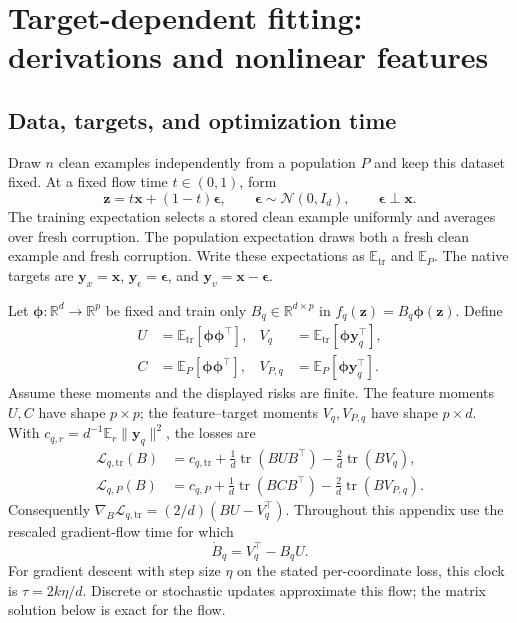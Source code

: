 \section{Target-dependent fitting: derivations and nonlinear features}
\label{app:target_fitting}

\subsection{Data, targets, and optimization time}
Draw $n$ clean examples independently from a population $P$ and keep this
dataset fixed. At a fixed flow time $t\in(0,1)$, form
\[
 \mathbf z=t\mathbf x+(1-t)\boldsymbol\epsilon,
 \qquad \boldsymbol\epsilon\sim\mathcal N(0,I_d),
 \qquad \boldsymbol\epsilon\perp\mathbf x.
\]
The training expectation selects a stored clean example uniformly and
averages over fresh corruption. The population expectation draws both a
fresh clean example and fresh corruption. Write these expectations as
$\mathbb E_{\mathrm{tr}}$ and $\mathbb E_P$.
The native targets are
$\mathbf y_x=\mathbf x$, $\mathbf y_\epsilon=\boldsymbol\epsilon$, and
$\mathbf y_v=\mathbf x-\boldsymbol\epsilon$.

Let $\boldsymbol\phi:\mathbb R^d\to\mathbb R^p$ be fixed and train only
$B_q\in\mathbb R^{d\times p}$ in
$f_q(\mathbf z)=B_q\boldsymbol\phi(\mathbf z)$. Define
\begin{align}
 U&=\mathbb E_{\mathrm{tr}}[\boldsymbol\phi\boldsymbol\phi^\top],&
 V_q&=\mathbb E_{\mathrm{tr}}[\boldsymbol\phi\mathbf y_q^\top],\\
 C&=\mathbb E_P[\boldsymbol\phi\boldsymbol\phi^\top],&
 V_{P,q}&=\mathbb E_P[\boldsymbol\phi\mathbf y_q^\top].
\end{align}
Assume these moments and the displayed risks are finite.
The feature moments $U,C$ have shape $p\times p$; the feature--target
moments $V_q,V_{P,q}$ have shape $p\times d$.
With $c_{q,r}=d^{-1}\mathbb E_r\|\mathbf y_q\|^2$, the losses are
\begin{align}
 \mathcal L_{q,\mathrm{tr}}(B)
 &=c_{q,\mathrm{tr}}+\frac1d\operatorname{tr}(BUB^\top)
   -\frac2d\operatorname{tr}(BV_q),\\
 \mathcal L_{q,P}(B)
 &=c_{q,P}+\frac1d\operatorname{tr}(BCB^\top)
   -\frac2d\operatorname{tr}(BV_{P,q}).
\end{align}
Consequently $\nabla_B\mathcal L_{q,\mathrm{tr}}
=(2/d)(BU-V_q^\top)$. Throughout this appendix use the rescaled
gradient-flow time for which
\begin{equation}
 \dot B_q=V_q^\top-B_qU.
 \label{eq:app_readout_flow}
\end{equation}
For gradient descent with step size $\eta$ on the stated per-coordinate
loss, this clock is $\tau=2k\eta/d$. Discrete or stochastic updates
approximate this flow; the matrix solution below is exact for the flow.

